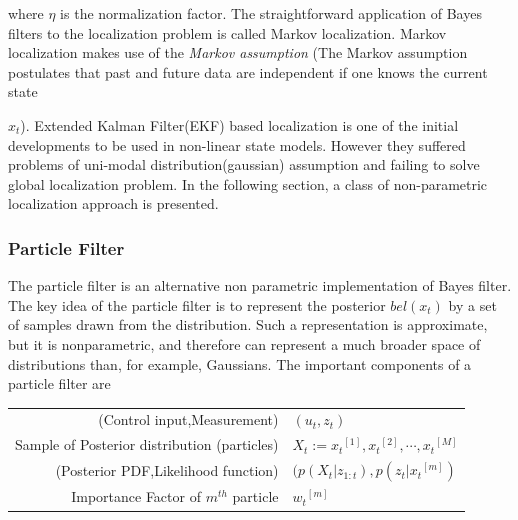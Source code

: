 where $\eta$ is the normalization factor. The straightforward application of Bayes filters to the localization problem is called Markov localization. Markov localization makes use of the \emph{Markov assumption} (The Markov assumption postulates that past and future data are independent if one knows the current state {$x_t$). Extended Kalman Filter(EKF) based localization is one of the initial developments to be used in non-linear state models. However they suffered problems of uni-modal distribution(gaussian) assumption and failing to solve global localization problem. In the following section, a class of non-parametric localization approach is presented. 
\subsubsection{Particle Filter}
\label{ssec:particlefilter}
	The particle filter \cite{thrun2005probabilistic} is an alternative non parametric implementation of Bayes filter. The key idea of the particle filter is to represent the posterior $bel(x_t)$ by a set of samples drawn from the distribution. Such a representation is approximate, but it is nonparametric, and therefore can represent a much broader space of distributions than, for example, Gaussians. The important components of a particle filter are\\
\begin{tabular}{r l}
\centering
  (Control input,Measurement) & $(u_t,z_t)$ \\ 
  Sample of Posterior distribution (particles) & $X_t := {x_t}^{[1]},{x_t}^{[2]},\cdots,{x_t}^{[M]}$ \\
  (Posterior PDF,Likelihood function) & $(p(X_t\vert z_{1:t}),p(z_t \vert {x_t}^{[m]})$ \\
  Importance Factor of $m^{th}$ particle & ${w_t}^{[m]}$ \\
\end{tabular}
	
}

